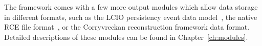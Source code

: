 The \apsq framework comes with a few more output modules which allow data storage in different formats, such as the LCIO persistency event data model~\cite{lcio}, the native RCE file format~\cite{rce}, or the Corryvreckan reconstruction framework data format.
Detailed descriptions of these modules can be found in Chapter~\ref{ch:modules}.

